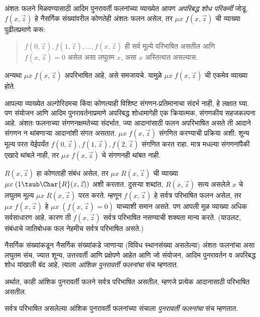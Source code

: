 अंशतः फलने मिळवण्यासाठी आदिम पुनरावर्ती फलनांच्या व्याख्येत आपण
\emph{अपरिबद्ध शोध परिकर्मी} जोडू. $f(x,\vec z)$ हे नैसर्गिक संख्यांवरील
कोणतेही अंशतः फलन असेल, तर $\mu x \; f(x,\vec z)$ ची व्याख्या पुढीलप्रमाणे
करू:
\begin{quote}
  $f(0,\vec z), f(1,\vec z), \dots, f(x,\vec
  z)$ ही सर्व मूल्ये परिभाषित असतील आणि $f(x,\vec z) = 0$ असेल असा लघुतम
  $x$, असा $x$ अस्तित्वात असल्यास.
\end{quote}
अन्यथा $\mu x \; f(x,\vec z)$ अपरिभाषित आहे, असे समजायचे. यामुळे
$\mu x \; f(x,\vec z)$ ची एकमेव व्याख्या होते.

\begin{explain}
आपल्या व्याख्येत अल्गोरिदमचा
किंवा कोणत्याही विशिष्ट संगणन-प्रतिमानाचा संदर्भ नाही, हे लक्षात घ्या. पण
संयोजन आणि आदिम पुनरावर्तनाप्रमाणे अपरिबद्ध शोधामागेही एक क्रियात्मक,
संगणकीय सहजकल्पना आहे. अंशतः फलनाच्या संगणनक्षमतेच्या संदर्भात, ज्या
आदानांसाठी फलन अपरिभाषित असते ती आदाने संगणन न थांबणाऱ्या आदानांशी संगत
असतात. $\mu x \; f(x,\vec z)$ संगणित करण्याची प्रक्रिया अशी: शून्य मूल्य
परत येईपर्यंत $f(0,\vec z), f(1,\vec z), f(2,\vec z)$ संगणित करत राहा.
मात्र मधल्या संगणनांपैकी एखादे थांबले नाही, तर $\mu x \; f(x,\vec z)$ चे
संगणनही थांबत नाही.
\end{explain}

$R(x,\vec z)$ हा कोणताही संबंध असेल, तर $\mu x \; R(x,\vec z)$ ची व्याख्या
$\mu x \; (1 \tsub \Char{R}(x,\vec z))$ अशी करतात. दुसऱ्या शब्दांत,
$R(x,\vec z)$ सत्य असलेले $x$ चे लघुतम मूल्य $\mu x \; R(x,\vec z)$ परत
करते. म्हणून $f(x,\vec z)$ हे सर्वत्र परिभाषित फलन असेल, तर
$\mu x \; f(x,\vec z)$ हे $\mu x \; (f(x,\vec z) = 0)$ याच्याशी समान असते.
पण आपली मूळ व्याख्या अधिक सर्वसाधारण आहे, कारण ती $f(x,\vec z)$ सर्वत्र
परिभाषित नसण्याची शक्यता मान्य करते. (याउलट, संबंधाचे जातिबोधक फल नेहमीच
सर्वत्र परिभाषित असते.)

\begin{defn}
नैसर्गिक संख्यांकडून नैसर्गिक संख्यांकडे जाणाऱ्या (विविध स्थानसंख्या असलेल्या)
अंशतः फलनांचा असा लघुतम संच, ज्यात शून्य, उत्तरवर्ती आणि प्रक्षेपणे आहेत आणि
जो संयोजन, आदिम पुनरावर्तन व अपरिबद्ध शोध यांखाली बंद आहे, त्याला
\emph{आंशिक पुनरावर्ती फलनांचा} संच म्हणतात.
\end{defn}

अर्थात, काही आंशिक पुनरावर्ती फलने सर्वत्र परिभाषित असतील, म्हणजे प्रत्येक
आदानासाठी परिभाषित असतील.

\begin{defn}
\label{cmp:rec:par:defn:recursive-fn}
सर्वत्र परिभाषित असलेल्या आंशिक पुनरावर्ती फलनांच्या संचाला
\emph{पुनरावर्ती फलनांचा} संच म्हणतात.
\end{defn}

